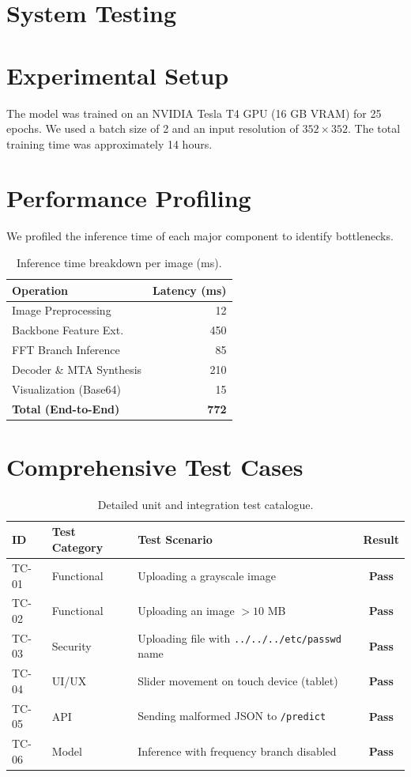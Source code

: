 \documentclass[12pt,a4paper]{report}
\begin{document}
\section{System Testing}\label{sec:systemtesting}

\section{Experimental Setup}
The model was trained on an NVIDIA Tesla T4 GPU (16 GB VRAM) for 25 epochs. We used a batch size of 2 and an input resolution of $352 \times 352$. The total training time was approximately 14 hours.

\section{Performance Profiling}
We profiled the inference time of each major component to identify bottlenecks.

\begin{table}[H]
\centering
\caption{Inference time breakdown per image (ms).}
\label{tab:profiling}
\begin{tabular}{@{}lr@{}}
\toprule
\textbf{Operation} & \textbf{Latency (ms)} \\
\midrule
Image Preprocessing     & 12 \\
Backbone Feature Ext.    & 450 \\
FFT Branch Inference     & 85 \\
Decoder \& MTA Synthesis & 210 \\
Visualization (Base64)  & 15 \\
\textbf{Total (End-to-End)} & \textbf{772} \\
\bottomrule
\end{tabular}
\end{table}

\section{Comprehensive Test Cases}

\begin{table}[H]
\centering
\caption{Detailed unit and integration test catalogue.}
\label{tab:testcases}
\begin{tabular}{@{}lp{3cm}p{7.5cm}c@{}}
\toprule
\textbf{ID} & \textbf{Test Category} & \textbf{Test Scenario} & \textbf{Result} \\
\midrule
TC-01 & Functional & Uploading a grayscale image & \textbf{Pass} \\
TC-02 & Functional & Uploading an image $> 10$ MB & \textbf{Pass} \\
TC-03 & Security   & Uploading file with \texttt{../../../etc/passwd} name & \textbf{Pass} \\
TC-04 & UI/UX      & Slider movement on touch device (tablet) & \textbf{Pass} \\
TC-05 & API        & Sending malformed JSON to \texttt{/predict} & \textbf{Pass} \\
TC-06 & Model      & Inference with frequency branch disabled & \textbf{Pass} \\
\bottomrule
\end{tabular}
\end{table}
\end{document}
